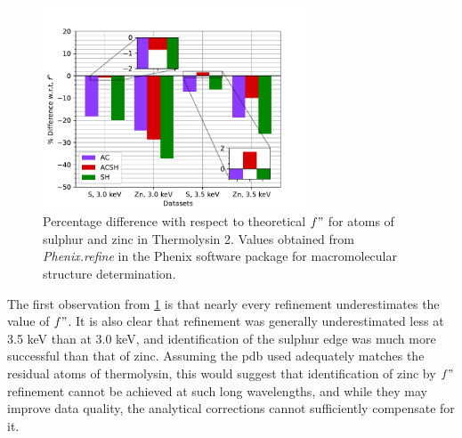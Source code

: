

\begin{figure}[h]
    \centering
    \includegraphics[width = 0.7\textwidth]{plots/exp1/tlys_2_P6122/FDP_percent_diff.pdf}
    \caption{Percentage difference with respect to theoretical $f"$ for atoms of sulphur and zinc in Thermolysin 2. Values obtained from \textit{Phenix.refine} in the Phenix software package for macromolecular structure determination.}
    \label{fig:phenix_plot}
\end{figure}

The first observation from \cref{fig:phenix_plot} is that nearly every refinement underestimates the value of $f"$. It is also clear that refinement was generally underestimated less at 3.5 \unit{keV} than at 3.0 \unit{keV}, and identification of the sulphur edge was much more successful than that of zinc. Assuming the \ac{pdb} used adequately matches the residual atoms of thermolysin, this would suggest that identification of zinc by $f"$ refinement cannot be achieved at such long wavelengths, and while they may improve data quality, the analytical corrections cannot sufficiently compensate for it. %

